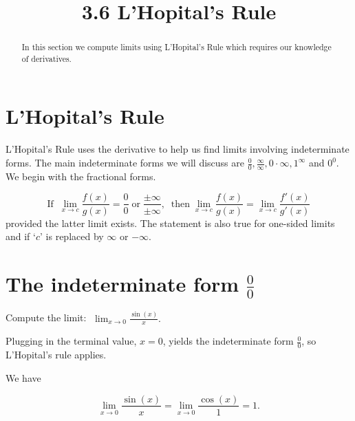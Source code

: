 \documentclass{ximera}
\title{3.6 L'Hopital's Rule}
\begin{document}
\begin{abstract}
In this section we compute limits using L'Hopital's Rule which requires our knowledge of derivatives.
\end{abstract}

\maketitle

\section{L'Hopital's Rule}

L'Hopital's Rule uses the derivative to help us find limits involving indeterminate forms. 
The main indeterminate forms we will discuss are $\frac 00, \frac{\infty}{\infty}, 0\cdot \infty, 1^\infty$ and $0^0$. We begin with the fractional forms.

\begin{theorem}

\[
\text{If} \;\; \lim_{x \to c} \frac{f(x)}{g(x)} = \frac{0}{0} \; \text{or} \; \frac{\pm \infty}{\pm \infty},
\;\;\text{then} \; \lim_{x \to c} \frac{f(x)}{g(x)} = \lim_{x \to c} \frac{f'(x)}{g'(x)}
\]
 provided the latter limit exists. The statement is also true for one-sided limits 
 and if `$c$' is replaced by $\infty$ or $-\infty$.
\end{theorem}



\section{The indeterminate form $\frac00$}


\begin{example}[example 1]
Compute the limit: $\displaystyle{\;\lim_{x \to 0} \frac{\sin(x)}{x}}.$

Plugging in the terminal value, $x=0$, yields 
the indeterminate form $\frac00$, so L'Hopital's rule applies.

We have 

\[\lim_{x \to 0} \frac{\sin(x)}{x} = \lim_{x \to 0} \frac{\cos(x)}{1} = 1.\]
\end{example}
\end{document}
